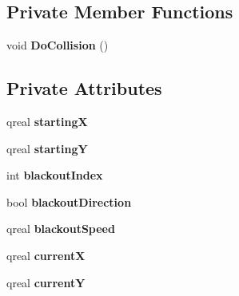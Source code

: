 \subsection*{Private Member Functions}
\begin{DoxyCompactItemize}
\item 
\hypertarget{classblackout_a68dda60fb533ec6e578c59790899e4b5}{void {\bfseries Do\-Collision} ()}\label{classblackout_a68dda60fb533ec6e578c59790899e4b5}

\end{DoxyCompactItemize}
\subsection*{Private Attributes}
\begin{DoxyCompactItemize}
\item 
\hypertarget{classblackout_a3ae61ab41918803a9d9c27d088829c01}{qreal {\bfseries starting\-X}}\label{classblackout_a3ae61ab41918803a9d9c27d088829c01}

\item 
\hypertarget{classblackout_a275734a6921bbba7880ebda0c20c436f}{qreal {\bfseries starting\-Y}}\label{classblackout_a275734a6921bbba7880ebda0c20c436f}

\item 
\hypertarget{classblackout_a80a12abbc15307e3cc92e20a7617ee87}{int {\bfseries blackout\-Index}}\label{classblackout_a80a12abbc15307e3cc92e20a7617ee87}

\item 
\hypertarget{classblackout_a53173b60d6f11714847898136c034471}{bool {\bfseries blackout\-Direction}}\label{classblackout_a53173b60d6f11714847898136c034471}

\item 
\hypertarget{classblackout_af005db656ad9129781a740837c12b444}{qreal {\bfseries blackout\-Speed}}\label{classblackout_af005db656ad9129781a740837c12b444}

\item 
\hypertarget{classblackout_a4706fbdcacf06793117040b0e85a3f18}{qreal {\bfseries current\-X}}\label{classblackout_a4706fbdcacf06793117040b0e85a3f18}

\item 
\hypertarget{classblackout_a9269902c8ea235ff4e5c003dfac3c901}{qreal {\bfseries current\-Y}}\label{classblackout_a9269902c8ea235ff4e5c003dfac3c901}

\end{DoxyCompactItemize}


